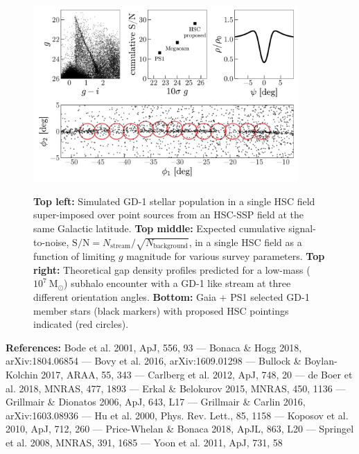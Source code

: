 \documentclass[11pt]{article}
\begin{document}
\begin{figure}[t]
\begin{center}
\includegraphics[width=0.9\textwidth]{figure1.pdf}
\caption{
\textbf{Top left:} Simulated GD-1 stellar population in a single HSC field super-imposed over point sources from an HSC-SSP field at the same Galactic latitude.
\textbf{Top middle:} Expected cumulative signal-to-noise, $\textrm{S}/\textrm{N} = N_{\textrm{stream}} / \sqrt{N_{\textrm{background}}}$, in a single HSC field as a function of limiting $g$ magnitude for various survey parameters.
\textbf{Top right:} Theoretical gap density profiles predicted for a low-mass ($10^7~\textrm{M}_\odot$) subhalo encounter with a GD-1 like stream at three different orientation angles.
\textbf{Bottom:} Gaia + PS1 selected GD-1 member stars (black markers) with proposed HSC pointings indicated (red circles).
}
\vspace{-1.5em}
\label{fig:}
\end{center}
\end{figure}

\textbf{References:}
Bode et al. 2001, ApJ, 556, 93 ---
Bonaca \& Hogg 2018, arXiv:1804.06854 ---
Bovy et al. 2016, arXiv:1609.01298 ---
Bullock \& Boylan-Kolchin 2017, ARAA, 55, 343 ---
Carlberg et al. 2012, ApJ, 748, 20 ---
de Boer et al. 2018, MNRAS, 477, 1893 ---
Erkal \& Belokurov 2015, MNRAS, 450, 1136 ---
Grillmair \& Dionatos 2006, ApJ, 643, L17 ---
Grillmair \& Carlin 2016, arXiv:1603.08936 ---
Hu et al. 2000, Phys. Rev. Lett., 85, 1158 ---
Koposov et al. 2010, ApJ, 712, 260 ---
Price-Whelan \& Bonaca 2018, ApJL, 863, L20 ---
Springel et al. 2008, MNRAS, 391, 1685 ---
Yoon et al. 2011, ApJ, 731, 58
\end{document}
